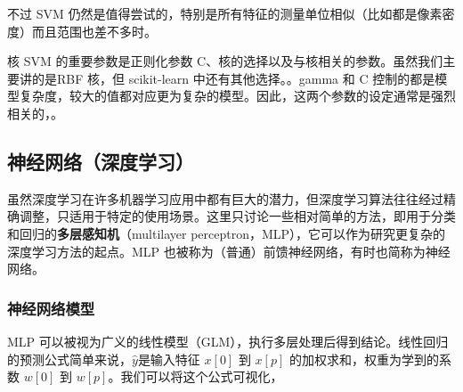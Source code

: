 不过 SVM 仍然是值得尝试的，特别是所有特征的测量单位相似（比如都是像素密度）而且范围也差不多时。

核 SVM 的重要参数是正则化参数 C、核的选择以及与核相关的参数。虽然我们主要讲的是RBF 核，但 scikit-learn 中还有其他选择。。gamma 和 C 控制的都是模型复杂度，较大的值都对应更为复杂的模型。因此，这两个参数的设定通常是强烈相关的，。

\subsection{神经网络（深度学习）}
虽然深度学习在许多机器学习应用中都有巨大的潜力，但深度学习算法往往经过精确调整，只适用于特定的使用场景。这里只讨论一些相对简单的方法，即用于分类和回归的\textbf{多层感知机}（multilayer perceptron，MLP），它可以作为研究更复杂的深度学习方法的起点。MLP 也被称为（普通）前馈神经网络，有时也简称为神经网络。

\subsubsection{神经网络模型}
MLP 可以被视为广义的线性模型（GLM），执行多层处理后得到结论。线性回归的预测公式简单来说，$\hat{y}$是输入特征 $x[0]$ 到 $x[p]$ 的加权求和，权重为学到的系数 $w[0]$ 到 $w[p]$。我们可以将这个公式可视化，

